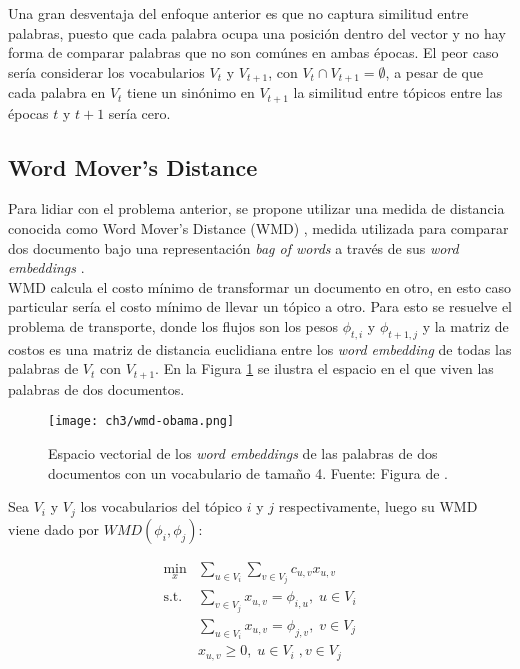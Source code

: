 Una gran desventaja del enfoque anterior es que no captura similitud entre palabras, puesto que cada palabra ocupa una posición dentro del vector y no hay forma de comparar palabras que no son comúnes en ambas épocas. El peor caso sería considerar los vocabularios $V_{t}$ y $V_{t+1}$, con $V_{t}\cap V_{t+1} =  \emptyset$, a pesar de que cada palabra en $V_{t}$ tiene un sinónimo en $V_{t+1}$ la similitud entre tópicos entre las épocas $t$ y $t+1$ sería cero.\\

\subsection{Word Mover's Distance}

Para lidiar con el problema anterior, se propone utilizar una medida de distancia conocida como Word Mover's Distance (WMD) \citep{kusner2015word}, medida utilizada para comparar dos documento bajo una representación \textit{bag of words} a través de sus \textit{word embeddings} \citep{mikolov2013distributed}.\\

WMD calcula el costo mínimo de transformar un documento en otro, en esto caso particular sería el costo mínimo de llevar un tópico a otro. Para esto se resuelve el problema de transporte, donde los flujos son los pesos $\phi_{t,i}$ y $\phi_{t+1,j}$ y la matriz de costos es una matriz de distancia euclidiana entre los \textit{word embedding} de todas las palabras de $V_{t}$ con $V_{t+1}$. En la Figura \ref{img:wmd_obama} se ilustra el espacio en el que viven las palabras de dos documentos.

\begin{figure}
    \centering
    \texttt{[image: ch3/wmd-obama.png]}
    \caption{Espacio vectorial de los \textit{word embeddings} de las palabras de dos documentos con un vocabulario de tamaño 4. Fuente: Figura de \citep{WMDPy}.}
    \label{img:wmd_obama}
\end{figure}

Sea  $V_{i}$ y $V_{j}$ los vocabularios del tópico $i$ y $j$ respectivamente, luego su WMD viene dado por $WMD(\phi_{i}, \phi_{j})$:

\begin{align}
\underset{x}{\text{min}}&\sum_{u \in V_{i}}\sum_{v \in V_{j}} c_{u,v}x_{u,v} \\ 
\textrm{s.t.} &\sum_{v \in V_{j}}x_{u,v}= \phi_{i,u}, \; u \in V_{i}\\ 
& \sum_{u \in V_{i}}x_{u,v}= \phi_{j,v}, \; v\in V_{j}\\
& x_{u,v} \geq 0,\; u \in V_{i} \;, v \in V_{j}\\ \nonumber
\end{align}

